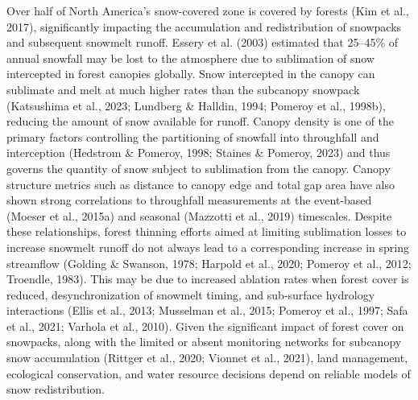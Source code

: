 \documentclass[
  letterpaper,
]{tex/uofsthesis-cs}
\begin{document}
Over half of North America's snow-covered zone is covered by forests
(Kim et al., 2017), significantly impacting the accumulation and
redistribution of snowpacks and subsequent snowmelt runoff. Essery et
al. (2003) estimated that 25--45\% of annual snowfall may be lost to the
atmosphere due to sublimation of snow intercepted in forest canopies
globally. Snow intercepted in the canopy can sublimate and melt at much
higher rates than the subcanopy snowpack (Katsushima et al., 2023;
Lundberg \& Halldin, 1994; Pomeroy et al., 1998b), reducing the amount
of snow available for runoff. Canopy density is one of the primary
factors controlling the partitioning of snowfall into throughfall and
interception (Hedstrom \& Pomeroy, 1998; Staines \& Pomeroy, 2023) and
thus governs the quantity of snow subject to sublimation from the
canopy. Canopy structure metrics such as distance to canopy edge and
total gap area have also shown strong correlations to throughfall
measurements at the event-based (Moeser et al., 2015a) and seasonal
(Mazzotti et al., 2019) timescales. Despite these relationships, forest
thinning efforts aimed at limiting sublimation losses to increase
snowmelt runoff do not always lead to a corresponding increase in spring
streamflow (Golding \& Swanson, 1978; Harpold et al., 2020; Pomeroy et
al., 2012; Troendle, 1983). This may be due to increased ablation rates
when forest cover is reduced, desynchronization of snowmelt timing, and
sub-surface hydrology interactions (Ellis et al., 2013; Musselman et
al., 2015; Pomeroy et al., 1997; Safa et al., 2021; Varhola et al.,
2010). Given the significant impact of forest cover on snowpacks, along
with the limited or absent monitoring networks for subcanopy snow
accumulation (Rittger et al., 2020; Vionnet et al., 2021), land
management, ecological conservation, and water resource decisions depend
on reliable models of snow redistribution.
\end{document}
